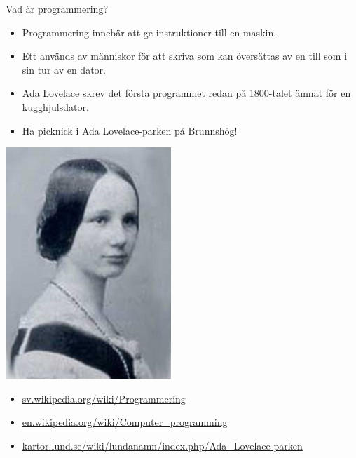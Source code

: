 


\begin{Slide}{Vad är programmering?}
\begin{itemize}
\item Programmering innebär att ge instruktioner till en maskin.
\item Ett  används av människor för att skriva  som kan översättas av en  till  som i sin tur  av en dator.
\end{itemize}


\begin{minipage}{.8\textwidth}
\begin{itemize}
\item Ada Lovelace skrev det första programmet redan på 1800-talet ämnat för en kugghjulsdator. 
\item Ha picknick i Ada Lovelace-parken på Brunnshög!
\end{itemize}
\end{minipage}%
\begin{minipage}{.2\textwidth}
\centering\includegraphics[width=0.6\columnwidth]{../img/ada}
\end{minipage}%
\begin{itemize}
\item \href{https://sv.wikipedia.org/wiki/Programmering}{sv.wikipedia.org/wiki/Programmering}
\item \href{https://en.wikipedia.org/wiki/Computer\_programming}{en.wikipedia.org/wiki/Computer\_programming}
\item \href{http://kartor.lund.se/wiki/lundanamn/index.php/Ada_Lovelace-parken}{kartor.lund.se/wiki/lundanamn/index.php/Ada\_Lovelace-parken}
\end{itemize}
\end{Slide}


